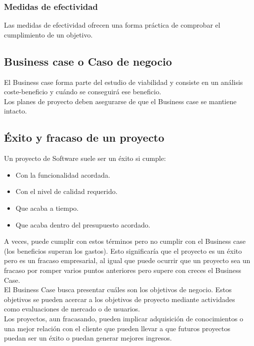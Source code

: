\documentclass[12pt]{article}
\begin{document}
\subsubsection{Medidas de efectividad}
\label{1.10.2}

{Las medidas de efectividad ofrecen una forma práctica de comprobar el cumplimiento de un objetivo.}

\subsection{Business case o Caso de negocio}
\label{1.11.0}

{El Business case forma parte del estudio de viabilidad y consiste en un análisis coste-beneficio y cuándo se conseguirá ese beneficio.}\\

{Los planes de proyecto deben asegurarse de que el Business case se mantiene intacto.}

\newpage

\subsection{Éxito y fracaso de un proyecto}
\label{1.12.0}

{Un proyecto de Software suele ser un éxito si cumple:}

\begin{itemize}
    \item {Con la funcionalidad acordada.}
    \item {Con el nivel de calidad requerido.}
    \item {Que acaba a tiempo.}
    \item {Que acaba dentro del presupuesto acordado.}
\end{itemize}

{A veces, puede cumplir con estos términos pero no cumplir con el Business case (los beneficios superan los gastos). Esto significaría que el proyecto es un éxito pero es un fracaso empresarial, al igual que puede ocurrir que un proyecto sea un fracaso por romper varios puntos anteriores pero supere con creces el Business Case.}\\

{El Business Case busca presentar cuáles son los objetivos de negocio. Estos objetivos se pueden acercar a los objetivos de proyecto mediante actividades como evaluaciones de mercado o de usuarios.}\\

{Los proyectos, aun fracasando, pueden implicar adquisición de conocimientos o una mejor relación con el cliente que pueden llevar a que futuros proyectos puedan ser un éxito o puedan generar mejores ingresos.}
\end{document}
